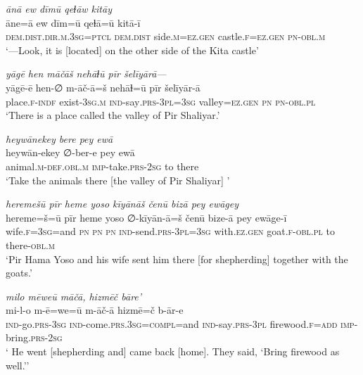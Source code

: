 \ea \label{ŽP.19}
\textit{ānā ew dīmū qeɫāw kitāy} \\ 
\gll āne=ā ew dīm=ū qeɫā=ū kitā-ī \\ 
 \textsc{dem.dist}\textsc{.dir}\textsc{.m}\textsc{.3sg}=\textsc{ptcl} \textsc{dem.dist} side\textsc{.m}\textsc{\textsc{=ez.gen}} castle\textsc{.f}\textsc{\textsc{=ez.gen}} \textsc{pn}\textsc{-obl}\textsc{.m} \\ 
\glt `—Look, it is [located] on the other side of the Kita castle'
\z 
 
\ea \label{ŽP.20}
\textit{yāgē hen māčāš nehāɫū pīr šelīyārā—} \\ 
\gll yāgē-ē hen-∅ m-āč-ā=š nehāɫ=ū pīr šelīyār-ā \\ 
 place\textsc{.f}\textsc{-indf} exist\textsc{-3sg}\textsc{.m} \textsc{ind-}say\textsc{.prs}\textsc{-3pl}\textsc{=3sg} valley\textsc{\textsc{=ez.gen}} \textsc{pn} \textsc{pn}\textsc{-obl}\textsc{.pl} \\ 
\glt `There is a place called the valley of Pir Shaliyar.'
\z 
 
\ea \label{ŽP.21}
\textit{heywānekey bere pey ewā} \\ 
\gll heywān-ekey ∅-ber-e pey ewā \\ 
 animal\textsc{.m}\textsc{-def}\textsc{.obl}\textsc{.m} \textsc{imp-}take\textsc{.prs}-\textsc{2sg} to there \\ 
\glt `Take the animals there [the valley of Pir Shaliyar] '
\z 
 
\ea \label{ŽP.22}
\textit{heremešū pīr heme yoso kīyānāš čenū bizā pey ewāgey} \\ 
\gll hereme=š=ū pīr heme yoso ∅-kīyān-ā=š čenū bize-ā pey ewāge-ī \\ 
 wife\textsc{.f}\textsc{=3sg}=and \textsc{pn} \textsc{pn} \textsc{pn} \textsc{ind-}send\textsc{.prs}\textsc{-3pl}\textsc{=3sg} with\textsc{.ez.gen} goat\textsc{.f}\textsc{-obl}\textsc{.pl} to there\textsc{-obl}\textsc{.m} \\ 
\glt `Pir Hama Yoso and his wife sent him there [for shepherding] together with the goats.'
\z 
 
\ea \label{ŽP.24}
\textit{milo mēweū māčā, hizmēč bāre’} \\ 
\gll mi-l-o m-ē=we=ū m-āč-ā hizmē=č b-ār-e \\ 
 \textsc{ind-}go\textsc{.prs}\textsc{-3sg} \textsc{ind-}come\textsc{.prs}\textsc{.3sg}\textsc{=compl}=and \textsc{ind-}say\textsc{.prs}\textsc{-3pl} firewood\textsc{.f}\textsc{=add} \textsc{imp-}bring\textsc{.prs}-\textsc{2sg} \\ 
\glt ` He went [shepherding and] came back [home]. They said, ‘Bring firewood as well.’'
\z 
 
